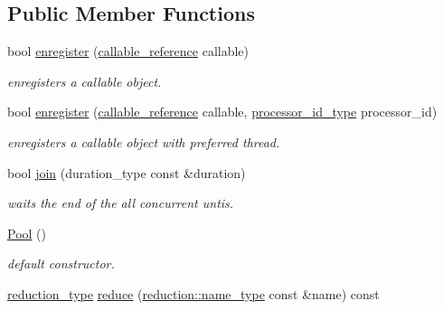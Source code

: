 \subsection*{Public Member Functions}
\begin{DoxyCompactItemize}
\item 
\hypertarget{classhryky_1_1thread_1_1_pool_ad3e2de38ca9e4803b2466baa3ab8d26d}{bool \hyperlink{classhryky_1_1thread_1_1_pool_ad3e2de38ca9e4803b2466baa3ab8d26d}{enregister} (\hyperlink{classhryky_1_1thread_1_1_pool_adf3dc9b77ef4669d18ed2229c9b5697d}{callable\-\_\-reference} callable)}\label{classhryky_1_1thread_1_1_pool_ad3e2de38ca9e4803b2466baa3ab8d26d}

\begin{DoxyCompactList}\small\item\em enregisters a callable object. \end{DoxyCompactList}\item 
\hypertarget{classhryky_1_1thread_1_1_pool_af047102969191afe4ab1f66ee200c55d}{bool \hyperlink{classhryky_1_1thread_1_1_pool_af047102969191afe4ab1f66ee200c55d}{enregister} (\hyperlink{classhryky_1_1thread_1_1_pool_adf3dc9b77ef4669d18ed2229c9b5697d}{callable\-\_\-reference} callable, \hyperlink{namespacehryky_a5e2737162aa470ce3920f86e86eac0bc}{processor\-\_\-id\-\_\-type} processor\-\_\-id)}\label{classhryky_1_1thread_1_1_pool_af047102969191afe4ab1f66ee200c55d}

\begin{DoxyCompactList}\small\item\em enregisters a callable object with preferred thread. \end{DoxyCompactList}\item 
bool \hyperlink{classhryky_1_1thread_1_1_pool_ab131e2d89db71b2b8e27086cacfcc761}{join} (duration\-\_\-type const \&duration)
\begin{DoxyCompactList}\small\item\em waits the end of the all concurrent untis. \end{DoxyCompactList}\item 
\hyperlink{classhryky_1_1thread_1_1_pool_a3e06da22084014145905237a51f495e0}{Pool} ()
\begin{DoxyCompactList}\small\item\em default constructor. \end{DoxyCompactList}\item 
\hypertarget{classhryky_1_1thread_1_1_pool_af894bce076ed5cdf84efeee2c44b9cf1}{\hyperlink{namespacehryky_a343a9a4c36a586be5c2693156200eadc}{reduction\-\_\-type} \hyperlink{classhryky_1_1thread_1_1_pool_af894bce076ed5cdf84efeee2c44b9cf1}{reduce} (\hyperlink{namespacehryky_1_1reduction_ac686c30a4c8d196bbd0f05629a6b921f}{reduction\-::name\-\_\-type} const \&name) const }\label{classhryky_1_1thread_1_1_pool_af894bce076ed5cdf84efeee2c44b9cf1}


\end{DoxyCompactItemize}
